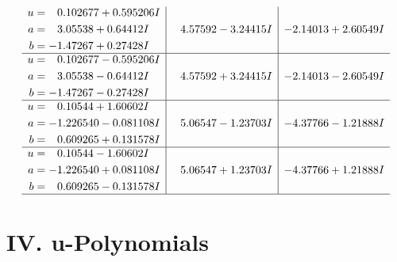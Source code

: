 \documentclass[1p]{elsarticle_modified}
\theoremstyle{definition}
\begin{document}
$$\begin{array}{c|c|c}
\begin{aligned}
u &= \phantom{-}0.102677 + 0.595206 I \\
a &= \phantom{-}3.05538 + 0.64412 I \\
b &= -1.47267 + 0.27428 I\end{aligned}
 & \phantom{-}4.57592 - 3.24415 I & -2.14013 + 2.60549 I \\ \hline\begin{aligned}
u &= \phantom{-}0.102677 - 0.595206 I \\
a &= \phantom{-}3.05538 - 0.64412 I \\
b &= -1.47267 - 0.27428 I\end{aligned}
 & \phantom{-}4.57592 + 3.24415 I & -2.14013 - 2.60549 I \\ \hline\begin{aligned}
u &= \phantom{-}0.10544 + 1.60602 I \\
a &= -1.226540 - 0.081108 I \\
b &= \phantom{-}0.609265 + 0.131578 I\end{aligned}
 & \phantom{-}5.06547 - 1.23703 I & -4.37766 - 1.21888 I \\ \hline\begin{aligned}
u &= \phantom{-}0.10544 - 1.60602 I \\
a &= -1.226540 + 0.081108 I \\
b &= \phantom{-}0.609265 - 0.131578 I\end{aligned}
 & \phantom{-}5.06547 + 1.23703 I & -4.37766 + 1.21888 I\\
 \hline 
 \end{array}$$\newpage
\newpage\renewcommand{\arraystretch}{1}
\centering \section*{ IV. u-Polynomials}
\end{document}
